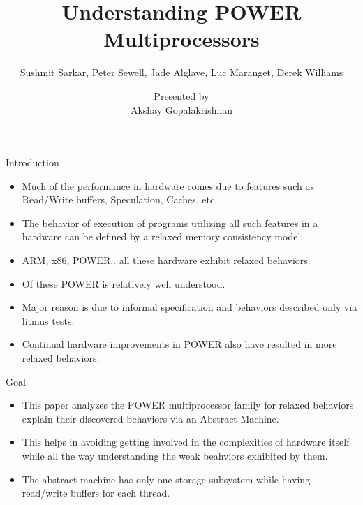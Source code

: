 \documentclass[notes, xcolor=dvipsnames]{beamer}
\title{Understanding POWER Multiprocessors}
\subtitle{Sushmit Sarkar, Peter Sewell, Jade Alglave, Luc Maranget, Derek Williams}
\author{Presented by \\ Akshay Gopalakrishnan}
\begin{document}
    
    \begin{frame}

        \maketitle

    \end{frame}

    \begin{frame}{Introduction}

        \begin{itemize}
            \item Much of the performance in hardware comes due to features such as Read/Write buffers, Speculation, Caches, etc.
            \item The behavior of execution of programs utilizing all such features in a hardware can be defined by a relaxed memory consistency model.
            \item ARM, x86, POWER.. all these hardware exhibit relaxed behaviors.
            \item Of these POWER is relatively well understood.
            \item Major reason is due to informal specification and behaviors described only via litmus tests. 
            \item Continual hardware improvements in POWER also have resulted in more relaxed behaviors.
        \end{itemize}

    \end{frame}

    \begin{frame}{Goal}

        \begin{itemize}
            \item This paper analyzes the POWER multiprocessor family for relaxed behaviors explain their discovered behaviors via an Abstract Machine.
            \item This helps in avoiding getting involved in the complexities of hardware itself while all the way understanding the weak beahviors exhibited by them.
            \item The abstract machine has only one storage subsystem while having read/write buffers for each thread.
        \end{itemize}
        
    \end{frame}
\end{document}
